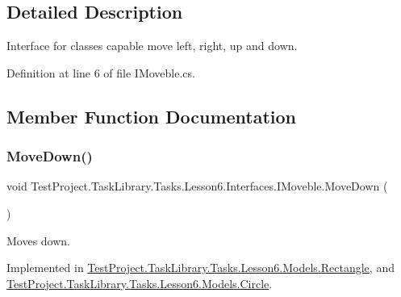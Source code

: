 \subsection{Detailed Description}
Interface for classes capable move left, right, up and down. 



Definition at line 6 of file I\+Moveble.\+cs.



\subsection{Member Function Documentation}
\mbox{\label{interface_test_project_1_1_task_library_1_1_tasks_1_1_lesson6_1_1_interfaces_1_1_i_moveble_a23443cd54657cc981a48ef7f9904185d}} 
\subsubsection{\texorpdfstring{MoveDown()}{MoveDown()}}
{\footnotesize\ttfamily void Test\+Project.\+Task\+Library.\+Tasks.\+Lesson6.\+Interfaces.\+I\+Moveble.\+Move\+Down (\begin{DoxyParamCaption}{ }\end{DoxyParamCaption})}



Moves down. 



Implemented in \mbox{\hyperlink{class_test_project_1_1_task_library_1_1_tasks_1_1_lesson6_1_1_models_1_1_rectangle_a46416a1374137c9536a3cf0eae8fd2f8}{Test\+Project.\+Task\+Library.\+Tasks.\+Lesson6.\+Models.\+Rectangle}}, and \mbox{\hyperlink{class_test_project_1_1_task_library_1_1_tasks_1_1_lesson6_1_1_models_1_1_circle_a4696527a84763f1a272e58532916bd48}{Test\+Project.\+Task\+Library.\+Tasks.\+Lesson6.\+Models.\+Circle}}.

\mbox{\label{interface_test_project_1_1_task_library_1_1_tasks_1_1_lesson6_1_1_interfaces_1_1_i_moveble_a277cd113ed9b4f35228f1c84bb17e91e}} 
